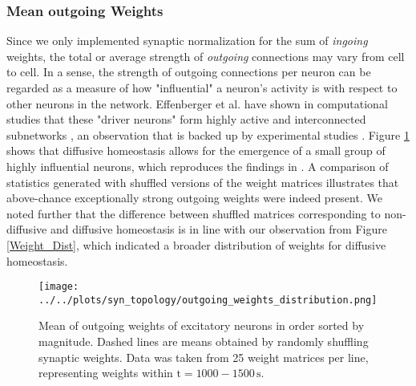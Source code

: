 \documentclass[10pt,a4paper]{article}
\begin{document}
\subsubsection{Mean outgoing Weights}\label{Section_Mean_outgoing_Weights}
Since we only implemented synaptic normalization for the sum of \emph{ingoing} weights, the total or average strength of \emph{outgoing} connections may vary from cell to cell. In a sense, the strength of outgoing connections per neuron can be regarded as a measure of how "influential" a neuron's activity is with respect to other neurons in the network. Effenberger et al. have shown in computational studies that these "driver neurons" form highly active and interconnected subnetworks \cite{Effenberger_2015}, an observation that is backed up by experimental studies \cite{Yassin_Subnetworks_2010,Eckmann_Leader_Neurons_2008}. Figure \ref{Out_Weight_Mean_Quantile} shows that diffusive homeostasis allows for the emergence of a small group of highly influential neurons, which reproduces the findings in \cite{Effenberger_2015}. A comparison of statistics generated with shuffled versions of the weight matrices illustrates that above-chance exceptionally strong outgoing weights were indeed present. We noted further that the difference between shuffled matrices corresponding to non-diffusive and diffusive homeostasis is in line with our observation from Figure \ref{Weight_Dist}, which indicated a broader distribution of weights for diffusive homeostasis.
\begin{figure}
\texttt{[image: ../../plots/syn\_topology/outgoing\_weights\_distribution.png]}
\caption{Mean of outgoing weights of excitatory neurons in order sorted by magnitude. Dashed lines are means obtained by randomly shuffling synaptic weights. Data was taken from 25 weight matrices per line, representing weights within $\mathrm{t=1000-1500\,s}$.}
\label{Out_Weight_Mean_Quantile}
\end{figure}
\end{document}
